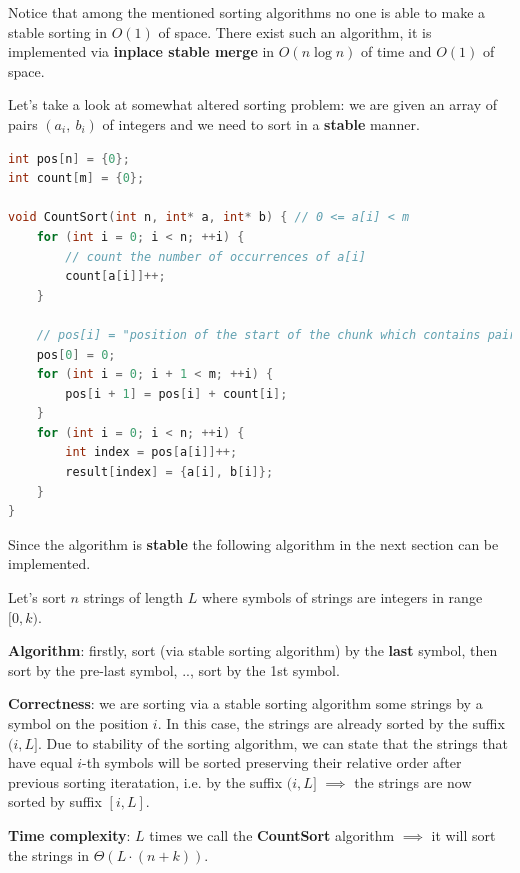 Notice that among the mentioned sorting algorithms no one is able to make a stable sorting in $O(1)$ of space. There exist such an algorithm, it is implemented via \textbf{inplace stable merge} in $O(n \log{n})$ of time and $O(1)$ of space.



Let's take a look at somewhat altered sorting problem: we are given an array of pairs $(a_i,\ b_i)$ of integers and we need to sort in a \textbf{stable} manner.

\begin{lstlisting}[language=C++]
int pos[n] = {0};
int count[m] = {0};

void CountSort(int n, int* a, int* b) { // 0 <= a[i] < m
    for (int i = 0; i < n; ++i) {
        // count the number of occurrences of a[i]
        count[a[i]]++;
    }

    // pos[i] = "position of the start of the chunk which contains pairs <i, ?>"
    pos[0] = 0;
    for (int i = 0; i + 1 < m; ++i) {
        pos[i + 1] = pos[i] + count[i];
    }
    for (int i = 0; i < n; ++i) {
        int index = pos[a[i]]++;
        result[index] = {a[i], b[i]};
    }
}
\end{lstlisting}

Since the algorithm is \textbf{stable} the following algorithm in the next section can be implemented.



Let's sort $n$ strings of length $L$ where symbols of strings are integers in range $[0, k)$.

\textbf{Algorithm}: firstly, sort (via stable sorting algorithm) by the \textbf{last} symbol, then sort by the pre-last symbol, .., sort by the 1st symbol.

\textbf{Correctness}: we are sorting via a stable sorting algorithm some strings by a symbol on the position $i$. In this case, the strings are already sorted by the suffix $(i, L]$. Due to stability of the sorting algorithm, we can state that the strings that have equal $i$-th symbols will be sorted preserving their relative order after previous sorting iteratation, i.e. by the suffix $(i, L]$ $\implies$ the strings are now sorted by suffix $[i, L]$.

\textbf{Time complexity}: $L$ times we call the \textbf{CountSort} algorithm $\implies$ it will sort the strings in $\Theta(L \cdot (n + k))$.

